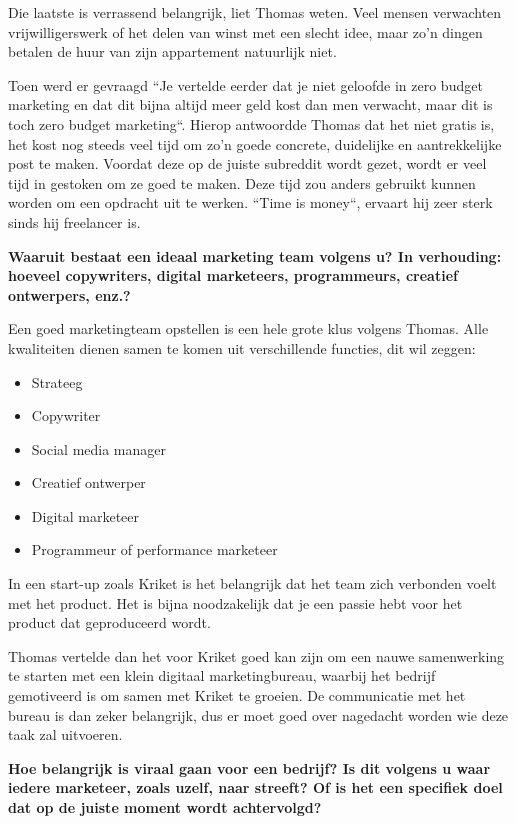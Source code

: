 Die laatste is verrassend belangrijk, liet Thomas weten. Veel mensen verwachten vrijwilligerswerk of het delen van winst met een slecht idee, maar zo'n dingen betalen de huur van zijn appartement natuurlijk niet.

Toen werd er gevraagd ``Je vertelde eerder dat je niet geloofde in zero budget marketing en dat dit bijna altijd meer geld kost dan men verwacht, maar dit is toch zero budget marketing``. Hierop antwoordde Thomas dat het niet gratis is, het kost nog steeds veel tijd om zo'n goede concrete, duidelijke en aantrekkelijke post te maken. Voordat deze op de juiste subreddit wordt gezet, wordt er veel tijd in gestoken om ze goed te maken. Deze tijd zou anders gebruikt kunnen worden om een opdracht uit te werken. ``Time is money``, ervaart hij zeer sterk sinds hij freelancer is.
	
\textbf{Waaruit bestaat een ideaal marketing team volgens u? In verhouding: hoeveel copywriters, digital marketeers, programmeurs, creatief ontwerpers, enz.?}
	
Een goed marketingteam opstellen is een hele grote klus volgens Thomas. Alle kwaliteiten dienen samen te komen uit verschillende functies, dit wil zeggen:

\begin{itemize} 
	\item Strateeg
	\item Copywriter
	\item Social media manager
	\item Creatief ontwerper
	\item Digital marketeer
	\item Programmeur of performance marketeer
\end{itemize} 

In een start-up zoals Kriket is het belangrijk dat het team zich verbonden voelt met het product. Het is bijna noodzakelijk dat je een passie hebt voor het product dat geproduceerd wordt.

Thomas vertelde dan het voor Kriket goed kan zijn om een nauwe samenwerking te starten met een klein digitaal marketingbureau, waarbij het bedrijf gemotiveerd is om samen met Kriket te groeien. De communicatie met het bureau is dan zeker belangrijk, dus er moet goed over nagedacht worden wie deze taak zal uitvoeren.
	
\textbf{Hoe belangrijk is viraal gaan voor een bedrijf? Is dit volgens u waar iedere marketeer, zoals uzelf, naar streeft? Of is het een specifiek doel dat op de juiste moment wordt achtervolgd?}
	
